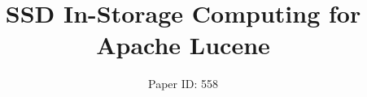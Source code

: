 

\title{SSD In-Storage Computing for Apache Lucene}



\author{Paper ID: 558}
\maketitle



















